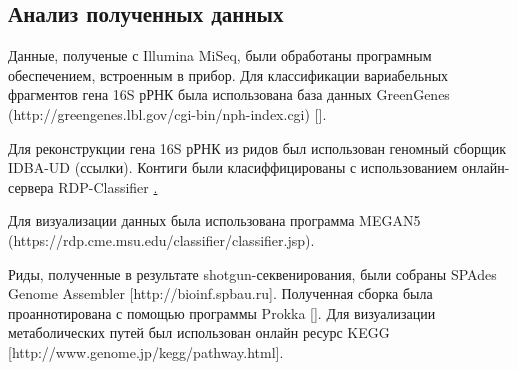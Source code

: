 \subsection{Анализ полученных данных}  \label{subsect1_2_5}

Данные, полученые с Illumina MiSeq, были обработаны програмным обеспечением, встроенным в прибор. Для классификации вариабельных фрагментов гена 16S рРНК была использована база данных GreenGenes (http://greengenes.lbl.gov/cgi-bin/nph-index.cgi) []. 

Для реконструкции гена 16S рРНК из ридов был использован геномный сборщик IDBA-UD (ссылки). Контиги были класиффицированы с использованием онлайн-сервера RDP-Classifier \href{https://rdp.cme.msu.edu/classifier/classifier.jsp} . 

Для визуализации данных была использована программа MEGAN5 (https://rdp.cme.msu.edu/classifier/classifier.jsp).

Риды, полученные в результате shotgun-секвенирования, были собраны SPAdes Genome Assembler [http://bioinf.spbau.ru]. Полученная сборка была проаннотирована с помощью программы Prokka []. Для визуализации метаболических путей был использован онлайн ресурс KEGG [http://www.genome.jp/kegg/pathway.html]. 


\clearpage
